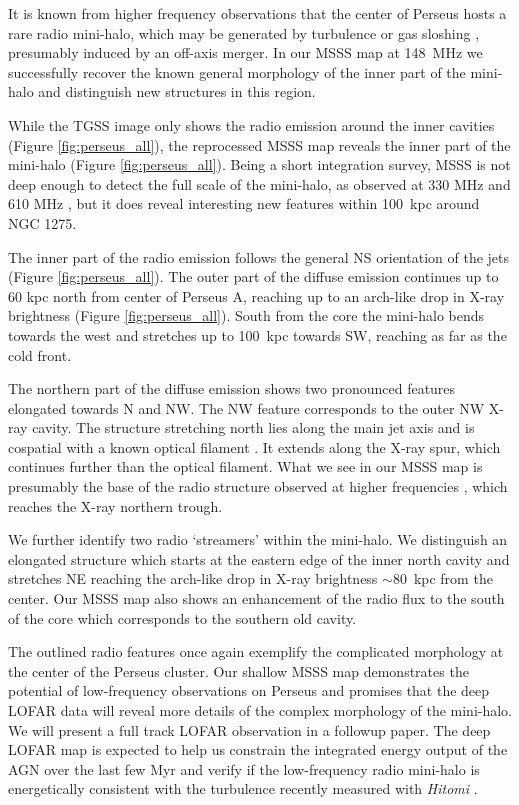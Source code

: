 \documentclass{aa}  %
\begin{document}
It is known from higher frequency observations that the center of Perseus hosts a rare \citep{Feretti2012} radio mini-halo, which may be generated by turbulence \citep{Gitti2004} or gas sloshing \citep{ZuHone2011, Mazzotta2008}, presumably induced by an off-axis merger.
In our MSSS map at 148~MHz we successfully recover the known general morphology of the inner part of the mini-halo and distinguish new structures in this region.

While the TGSS image only shows the radio emission around the inner cavities (Figure \ref{fig:perseus_all}), the reprocessed MSSS map reveals the inner part of the mini-halo (Figure \ref{fig:perseus_all}).
Being a short integration survey, MSSS is not deep enough to detect the full scale of the mini-halo, as observed at 330 MHz \citep{Burns1992, DeBruyn2005} and 610 MHz \citep{Sijbring1993}, but it does reveal interesting new features within 100~kpc around NGC 1275.

The inner part of the radio emission follows the general NS orientation of the jets (Figure \ref{fig:perseus_all}).
The outer part of the diffuse emission continues up to 60 kpc north from center of Perseus A, reaching up to an arch-like drop in X-ray brightness (Figure \ref{fig:perseus_all}).
South from the core the mini-halo bends towards the west and stretches up to 100~kpc  towards SW, reaching as far as the cold front.

The northern part of the diffuse emission shows two pronounced features elongated towards N and NW.
The NW feature corresponds to the outer NW X-ray cavity. 
The structure stretching north lies along the main jet axis and is cospatial with a known optical filament \citep{Conselice2001, Fabian2011}.
It extends along the X-ray spur, which continues further than the optical filament.
What we see in our MSSS map is presumably the base of the radio structure observed at higher frequencies \citep{Burns1992, Sijbring1993, DeBruyn2005}, which reaches the X-ray northern trough.

We further identify two radio `streamers' within the mini-halo.
We distinguish an elongated structure which starts at the eastern edge of the inner north cavity and stretches NE reaching the arch-like drop in X-ray brightness $\sim$80~kpc from the center.
Our MSSS map also shows an enhancement of the radio flux to the south of the core which corresponds to the southern old cavity.

The outlined radio features once again exemplify the complicated morphology at the center of the Perseus cluster.
Our shallow MSSS map demonstrates the potential of low-frequency observations on Perseus and promises that the deep LOFAR data will reveal more details of the complex morphology of the mini-halo.
We will present a full track LOFAR observation in a followup paper.
The deep LOFAR map is expected to help us constrain the integrated energy output of the AGN over the last few Myr and verify if the low-frequency radio mini-halo is energetically consistent with the turbulence recently measured with \textit{Hitomi} \citep{Hitomi2016}.
\end{document}
